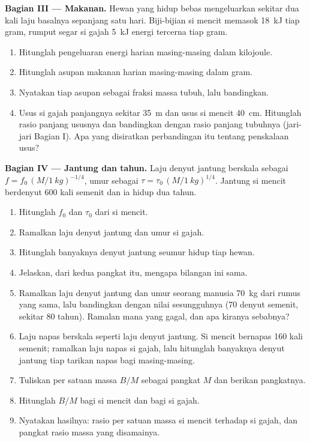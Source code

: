 \begin{problem}
\medskip
\noindent\textbf{Bagian III --- Makanan.}
Hewan yang hidup bebas mengeluarkan sekitar dua kali laju basalnya
sepanjang satu hari. Biji-bijian si mencit memasok \qty{18}{kJ} tiap
gram, rumput segar si gajah \qty{5}{kJ} energi tercerna tiap gram.
\begin{enumerate}[resume]
  \item Hitunglah pengeluaran energi harian masing-masing dalam
        kilojoule.
  \item Hitunglah asupan makanan harian masing-masing dalam gram.
  \item Nyatakan tiap asupan sebagai fraksi massa tubuh, lalu
        bandingkan.
  \item Usus si gajah panjangnya sekitar \qty{35}{m} dan usus si mencit
        \qty{40}{cm}. Hitunglah rasio panjang ususnya dan bandingkan
        dengan rasio panjang tubuhnya (jari-jari Bagian I). Apa yang
        disiratkan perbandingan itu tentang penskalaan usus?
\end{enumerate}

\medskip
\noindent\textbf{Bagian IV --- Jantung dan tahun.}
Laju denyut jantung berskala sebagai $f = f_0\,(M/\qty{1}{kg})^{-1/4}$,
umur sebagai $\tau = \tau_0\,(M/\qty{1}{kg})^{1/4}$. Jantung si mencit
berdenyut \qty{600}{} kali semenit dan ia hidup dua tahun.
\begin{enumerate}[resume]
  \item Hitunglah $f_0$ dan $\tau_0$ dari si mencit.
  \item Ramalkan laju denyut jantung dan umur si gajah.
  \item Hitunglah banyaknya denyut jantung seumur hidup tiap hewan.
  \item Jelaskan, dari kedua pangkat itu, mengapa bilangan ini sama.
  \item Ramalkan laju denyut jantung dan umur seorang manusia
        \qty{70}{kg} dari rumus yang sama, lalu bandingkan dengan nilai
        sesungguhnya (\qty{70}{} denyut semenit, sekitar \qty{80}{}
        tahun). Ramalan mana yang gagal, dan apa kiranya sebabnya?
  \item Laju napas berskala seperti laju denyut jantung. Si mencit
        bernapas \qty{160}{} kali semenit; ramalkan laju napas si gajah,
        lalu hitunglah banyaknya denyut jantung tiap tarikan napas bagi
        masing-masing.
  \item Tuliskan  per satuan massa $B/M$ sebagai pangkat
        $M$ dan berikan pangkatnya.
  \item Hitunglah $B/M$ bagi si mencit dan bagi si gajah.
  \item Nyatakan hasilnya: rasio  per satuan massa si
        mencit terhadap si gajah, dan pangkat rasio massa yang
        disamainya.
\end{enumerate}
\end{problem}
